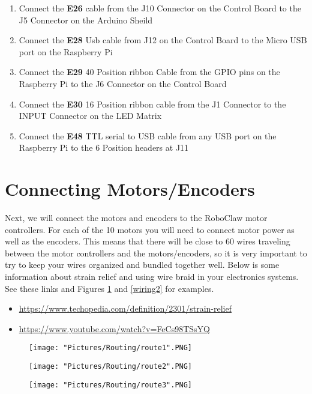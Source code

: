 \documentclass{article}
\begin{document}
\begin{enumerate}
	\item Connect the \textbf{E26} cable from the J10 Connector on the Control Board to the J5 Connector on the Arduino Sheild
	\item Connect the \textbf{E28} Usb cable from J12 on the Control Board to the Micro USB port on the Raspberry Pi
	\item Connect the \textbf{E29} 40 Position ribbon Cable from the GPIO pins on the Raspberry Pi to the J6 Connector on the Control Board
	\item Connect the \textbf{E30} 16 Position ribbon cable from the J1 Connector to the INPUT Connector on the LED Matrix
	\item Connect the \textbf{E48} TTL serial to USB cable from any USB port on the Raspberry Pi to the 6 Position headers at J11
\end{enumerate}

\section{Connecting Motors/Encoders}

Next, we will connect the motors and encoders to the RoboClaw motor controllers. For each of the 10 motors you will need to connect motor power as well as the encoders. This means that there will be close to 60 wires traveling between the motor controllers and the motors/encoders, so it is very important to try to keep your wires organized and bundled together well. Below is some information about strain relief and using wire braid in your electronics systems.  See these links and Figures \ref{wiring1} and \ref{wiring2} for examples.

\begin{itemize}
	\item \href{https://www.techopedia.com/definition/2301/strain-relief}{https://www.techopedia.com/definition/2301/strain-relief}
	\item \href{https://www.youtube.com/watch?v=FeCs98TSsYQ}{https://www.youtube.com/watch?v=FeCs98TSsYQ}
\end{itemize}


\begin{figure}[H]
  	\centering
  	\begin{minipage}[b]{0.34\textwidth}
    		\texttt{[image: "Pictures/Routing/route1".PNG]}
  	\end{minipage}
  	\hfill
  	\begin{minipage}[b]{0.29\textwidth}
    		\texttt{[image: "Pictures/Routing/route2".PNG]}
  	\end{minipage}
    	\hfill
  	\begin{minipage}[b]{0.30\textwidth}
    		\texttt{[image: "Pictures/Routing/route3".PNG]}
  	\end{minipage}
  	\caption{}
	\label{wiring1}
\end{figure}
\end{document}
